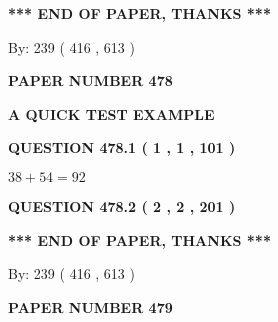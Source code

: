\documentclass[12pt]{article}
\begin{document}
   
   
   
   
\vspace{1.0in} 
{\textbf{\large{ *** END OF PAPER, THANKS *** }}} 
   
   
\hspace{1.0in} By: 
 239 ( 416 ,  613 )
   
   
   
   
\newpage 
\setcounter{page}{ 
   478001 } 
   
   
   
   
 {\textbf{ \Large{ PAPER NUMBER  478  }}}
   
   
\vspace{0.2in}
   
   
   
   
   
   
 \vspace{0.2in}
{\LARGE {\textbf{ A QUICK TEST EXAMPLE}}}
   
   
  
\vspace{0.2in}
  
{\textbf{\Large{QUESTION
478.1 
 ( 1 , 1 , 101 )
}}}
  
  
 
 

$ %
38 +  %
54=   %
92$
 
 
  
\vspace{0.2in}
  
{\textbf{\Large{QUESTION
478.2 
 ( 2 , 2 , 201 )
}}}
  
  
   
   
 \vspace{0.2in}
 
   
   
   
   
\vspace{1.0in} 
{\textbf{\large{ *** END OF PAPER, THANKS *** }}} 
   
   
\hspace{1.0in} By: 
 239 ( 416 ,  613 )
   
   
   
   
\newpage 
\setcounter{page}{ 
   479001 } 
   
   
   
   
 {\textbf{ \Large{ PAPER NUMBER  479  }}}
   
\end{document}

